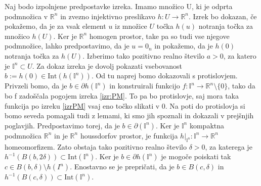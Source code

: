 \documentclass[mat1]{fmfdelo}
\newcommand{\R}{\mathbb R}
\newcommand{\I}{\mathbb I}
\newcommand{\0}{\underline{0}}
\newcommand{\Int}{\text{Int}}
\begin{document}
\begin{dokaz}
Naj bodo izpolnjene predpostavke izreka. Imamo množico U, ki je odprta podmnožica v $\R^n$ in zvezno injektivno preslikavo $h : U \rightarrow \R^n$. Izrek bo dokazan, če pokažemo, da je za vsak element $u$ iz množice $U$ točka $h(u)$ notranja točka za množico $h(U)$. Ker je $\R^n$ homogen prostor, take pa so tudi vse njegove podmnožice, lahko predpostavimo, da je $u = 0_n$ in pokažemo, da je $h(0)$ notranja točka za $h(U)$. Izberimo tako pozitivno realno število $a > 0$, za katero je $\I^n \subset U$. Za dokaz izreka  je dovolj pokazati vsebovanost $b := h(0) \in \Int(h(\I^n))$. Od tu naprej bomo dokazovali s protislovjem. Privzeli bomo, da je $b \in \partial h(\I^n)$ in konstruirali funkcijo $f : \I^n \to \R^n \setminus \{ 0 \}$, tako da bo f zadoščala pogojem izreka \ref{izr:PM}. To pa bo protislovje, saj mora taka funkcija po izreku \ref{izrPM} vsaj eno točko slikati v $0$. Na poti do protislovja si bomo seveda pomagali tudi z lemami, ki smo jih spoznali in dokazali v prejšnjih poglavjih. Predpostavimo torej, da je $b \in \partial (\I^n)$. Ker je $\I^n$ kompaktna podmnožica $\R^n$ in je $\R^n$ houssdorfov prostor, je funkcija $h|_{\I^n} : \I^n \to \R^n$ homeomorfizem. Zato obstaja tako pozitivno realno število $\delta > 0$, za katerega je $h^{-1}(B(b, 2 \delta)) \subset \Int(\I^n)$. Ker je $b \in \partial h(\I^n)$ je mogoče poiskati tak $c \in B(b, \delta) \setminus h(I^n)$. Enostavno se je prepričati, da je $b \in B(c, \delta)$ in $h^{-1} (B(c, \delta)) \subset \Int (\I^n)$.

\begin{figure}[h!]
	\centering
\end{figure}
\end{dokaz}
\end{document}
